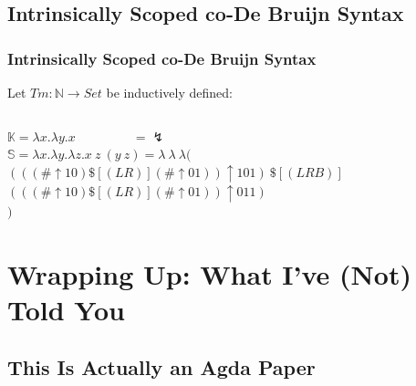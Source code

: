 \documentclass[aspectratio=169]{beamer}
\theoremstyle{remarkstyle}
\begin{document}
\subsection{Intrinsically Scoped co-De Bruijn Syntax}
\begin{frame}[fragile]
  \frametitle{Intrinsically Scoped co-De Bruijn Syntax}
  \begin{definition}
    Let $Tm : ℕ → Set$ be inductively defined: \\
    \begin{columns}
      \begin{column}{0.2\textwidth}
        \begin{center}
        \end{center}
      \end{column}
      \begin{column}{0.3\textwidth}
        \begin{center}
        \end{center}
      \end{column}
      \begin{column}{0.25\textwidth}
        \begin{center}
        \end{center}
      \end{column}
    \end{columns}
  \end{definition}
  \begin{example}
    $𝕂 = λx. λy. x \quad \quad \quad \quad \ \ = \lightning$\\
    $𝕊 = λx. λy. λz. x \ z \ (y \ z) = λ \ λ \ λ($\\
    \quad \quad $(((\# ↑ 10) \$[(LR)] (\# ↑ 01)) ↑ 101) \ \$[(LRB)] $\\
    \quad \quad $(((\# ↑ 10) \$[(LR)] (\# ↑ 01)) ↑ 011) $\\
    $)$
  \end{example}
\end{frame}

\section{Wrapping Up: What I've (Not) Told You}
\subsection{This Is Actually an Agda Paper}
\end{document}
